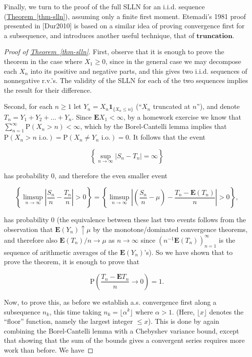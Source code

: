 \noindent Finally, we turn to the proof of the full SLLN for an
i.i.d. sequence (\hyperref[thm-slln]{Theorem~\ref*{thm-slln}}), assuming only a
finite first moment. Etemadi's 1981 proof presented in
[Dur2010] is based on a similar idea of proving
convergence first for a subsequence, and introduces
another useful technique, that of
$\textbf{truncation}$.

\begin{proof}[Proof of \texorpdfstring{\hyperref[thm-slln]{Theorem~\ref*{thm-slln}}}{Theorem}]
First, observe that it is enough to prove the theorem
in the case where $X_1\ge 0$, since in the general
case we may decompose each $X_n$ into its positive
and negative parts, and this gives two i.i.d.
sequences of nonnegative r.v.'s. The validity of the
SLLN for each of the two sequences implies the result
for their difference.

Second, for each $n\ge 1$ let
$Y_n = X_n \mathbf{1}_{\{X_n\le n\}}$ (``$X_n$
truncated at $n$''), and denote
$T_n=Y_1+Y_2+\ldots +Y_n$. Since
$\mathbf{E} X_1<\infty$, by a homework exercise we
know that
$\sum_{n=1}^\infty \mathrm{P}(X_n> n)<\infty$, which
by the Borel-Cantelli lemma implies that
$\mathrm{P}(X_n>n\textrm{ i.o.}) = \mathrm{P}(X_n\neq
Y_n\textrm{ i.o.}) = 0$.
It follows that the event

\[
\left\{ \sup_{n\to\infty} |S_n-T_n|=\infty \right\}
\]

\noindent has probability 0, and therefore the even smaller
event

\[
\left\{ \limsup_{n\to\infty} \left|\frac{S_n}{n}-\frac{T_n}{n} \right|>0 \right\}=
\left\{ \limsup_{n\to\infty} \left|\left(\frac{S_n}{n}-\mu\right)-\frac{T_n-\mathbf{E}(T_n)}{n} \right|>0 \right\},
\]

\noindent has probability 0 (the equivalence between these last
two events follows from the observation that
$\mathbf{E}(Y_n)\uparrow \mu$ by the
monotone/dominated convergence theorems, and therefore
also $\mathbf{E}(T_n)/n\to\mu$ as $n\to\infty$ since
$(n^{-1} \mathbf{E}(T_n))_{n=1}^\infty$ is the
sequence of arithmetic averages of the
$\mathbf{E}(Y_n)$'s). So we have shown that to prove
the theorem, it is enough to prove that

\[
\mathrm{P}\left(\frac{T_n-\mathbf{E} T_n}{n}\to0\right) = 1.
\]

\noindent Now, to prove this, as before we establish a.s.
convergence first along a subsequence $n_k$, this
time taking $n_k = \lfloor \alpha^k \rfloor$ where
$\alpha>1$. (Here, $\lfloor x\rfloor$ denotes the
``floor'' function, namely the largest integer
$\le x$). This is done by again combining the
Borel-Cantelli lemma with a Chebyshev variance bound,
except that showing that the sum of the bounds gives a
convergent series requires more work than before. We
have


\end{proof}
